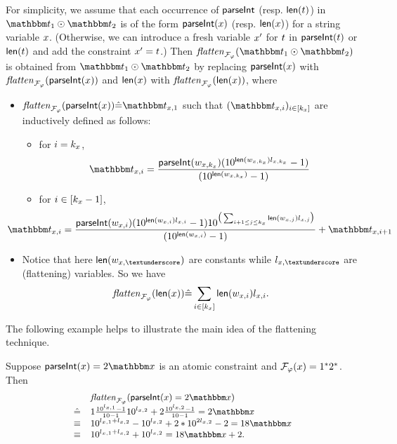 For simplicity, we assume that each occurrence of $\textsf{parseInt}$ (resp. $\textsf{len}(t)$) in $\iterm_1 \op \iterm_2$ is of the form $\textsf{parseInt}(x)$ (resp. $\textsf{len}(x)$) for a string variable $x$. (Otherwise, we can introduce a fresh variable $x'$ for $t$ in $\textsf{parseInt}(t)$ or $\textsf{len}(t)$ and add the constraint $x' = t$.)
Then $\flatten_{\flatfun_\varphi}(\iterm_1 \op \iterm_2)$ is obtained from $\iterm_1 \op \iterm_2$ by replacing $\textsf{parseInt}(x)$ with $\mathit{flatten}_{\mathcal{F}_\varphi}(\textsf{parseInt}(x))$ and $\textsf{len}(x)$ with $\mathit{flatten}_{\mathcal{F}_\varphi}(\textsf{len}(x))$, where 
\begin{itemize}
\item 
$\flatten_{\flatfun_\varphi}(\parseInt(\svarx)) \Def \iterm_{\svarx,1}$  such that $(\iterm_{\svarx, i})_{i \in [k_\svarx]}$ are inductively defined as follows: 
\begin{itemize}
\item for $i = k_x$, 
$$\iterm_{\svarx, i} = \frac{\parseInt(w_{\svarx, k_\svarx}) (10^{\len(w_{\svarx,k_\svarx})l_{\svarx, k_\svarx}} -1 )}{(10^{\len(w_{\svarx, k_\svarx}) } -1 )}$$ 
%
\item for $i \in [k_x-1]$, 
%
$$ \hspace{-1.2cm} \iterm_{\svarx, i} =  \frac{\parseInt(w_{\svarx, i}) (10^{\len(w_{\svarx, i})  l_{\svarx, i} } -1 ) 10^{\big(\sum_{i+1\le j\le k_x} \len(w_{\svarx, j})  l_{\svarx, j}\big)}} {(10^{\len(w_{\svarx, i}) } -1 )} + \iterm_{\svarx, i+1}$$
\end{itemize}
%
\item Notice that here $\len( w_{\svarx, \textunderscore } )$ are constants while $l_{\svarx, \textunderscore}$ are (flattening) variables. So we have 
$$\mathit{flatten}_{\mathcal{F}_\varphi}(\textsf{len}(x)) \hat{=} \sum \limits_{i \in [k_{x}]} \textsf{len}(w_{x, i})  l_{x, i}.$$ 
\end{itemize} 

The following example helps to illustrate the main idea of the flattening technique.

\begin{example}
Suppose $\parseInt(\svarx) = 2\ivarx$ is an atomic constraint and $\mathcal{F}_\varphi(x) = 1^*2^*$. Then 
\[
\small
\begin{array}{l l}
& \flatten_{\flatfun_\varphi}(\parseInt(\svarx)  =  2\ivarx)  \\
\Def & 1 \frac{10^{l_{\svarx,1}}-1}{10-1}10^{l_{\svarx,2}}  + 2 \frac{10^{l_{\svarx,2}}-1}{10-1} = 2\ivarx   \\
\equiv & 10^{l_{\svarx,1}+l_{\svarx,2}} - 10^{l_{\svarx,2}}  + 2*10^{2l_{\svarx,2}}- 2 = 18\ivarx \\
\equiv & 10^{l_{\svarx,1}+l_{\svarx,2}} +  10^{l_{\svarx,2}} = 18\ivarx + 2.
\end{array}
\]
\end{example}


